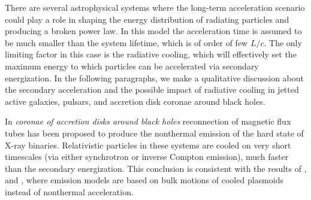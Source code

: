 There are several astrophysical systems where the long-term acceleration scenario could play a role in shaping the energy distribution of radiating particles and producing a broken power law. In this model the acceleration time is assumed to be much smaller than the system lifetime, which is of order of few $L/c$. The only limiting factor in this case is the radiative cooling, which will effectively set the maximum energy to which particles can be accelerated via secondary energization.  In the following paragraphs, we make a qualitative discussion about the secondary acceleration and the possible impact of radiative cooling in jetted active galaxies, pulsars, and accretion disk coronae around black holes.

In {\it coronae of accretion disks around black holes} reconnection of magnetic flux tubes has been proposed to produce the nonthermal emission of the hard state of X-ray binaries. Relativistic particles in these systems are cooled on very short timescales (via either synchrotron or inverse Compton emission), much faster than the secondary energization. This conclusion is consistent with the results of \citet{2017ApJ...850..141B, 2020ApJ...899...52S}, and  \citet{2019MNRAS.482L..60W}, where emission models are based on bulk motions of cooled plasmoids instead of nonthermal acceleration.

